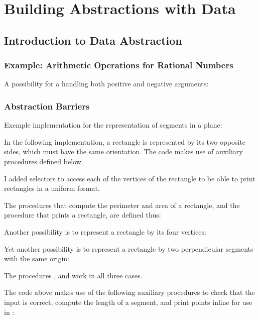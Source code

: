 \chapter{Building Abstractions with Data}

\section{Introduction to Data Abstraction}

\subsection{Example: Arithmetic Operations for Rational Numbers}

\begin{exe}[2.1]
    A possibility for a  handling both positive and negative 
    arguments:
\end{exe}

\subsection{Abstraction Barriers}

\begin{exe}[2.2]
    Exemple implementation for the representation of segments in a plane:
\end{exe}

\begin{exe}[2.3]
    In the following implementation, a rectangle is represented by its two 
    opposite sides, which must have the same orientation. The code makes use of 
    auxiliary procedures defined below.

    I added selectors to access each of the vertices of the rectangle to be 
    able to print rectangles in a uniform format.

    The procedures that compute the perimeter and area of a rectangle, and the 
    procedure that prints a rectangle, are defined thus:

    Another possibility is to represent a rectangle by its four vertices:

    Yet another possibility is to represent a rectangle by two perpendicular 
    segments with the same origin:

    The procedures ,  and  
    work in all three cases.

    \begin{comp}
        The code above makes use of the following auxiliary procedures to check 
        that the input is correct, compute the length of a segment, and print 
        points inline for use in :
    \end{comp}
\end{exe}

